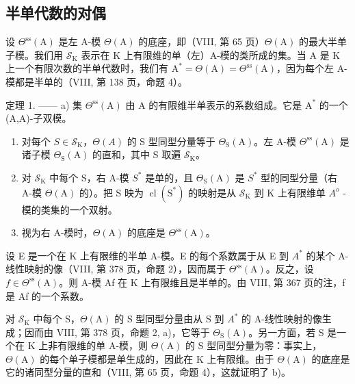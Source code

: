 \subsection{半单代数的对偶}

设 \(\Theta^{\mathrm{ss}}(\mathrm{A})\) 是左 A-模 \(\Theta (\mathrm{A})\) 的底座，即（VIII, 第 65 页）\(\Theta (\mathrm{A})\) 的最大半单子模。我们用 \(\mathcal{S}_{\mathrm{K}}\) 表示在 K 上有限维的单（左）A-模的类所成的集。当 A 是 K 上一个有限次数的半单代数时，我们有 \(\mathrm{A}^{*} = \Theta (\mathrm{A}) = \Theta^{\mathrm{ss}}(\mathrm{A})\)，因为每个左 A-模都是半单的（VIII, 第 138 页，命题 4）。

定理 1. —— a) 集 \(\Theta^{\mathrm{ss}}(\mathrm{A})\) 由 A 的有限维半单表示的系数组成。它是 \(\mathrm{A}^*\) 的一个 (A,A)-子双模。

\begin{enumerate}
\def\labelenumi{\alph{enumi})}
\setcounter{enumi}{1}
\item
  对每个 \(S \in \mathcal{S}_{\mathrm{K}}\)，\(\Theta(A)\) 的 S 型同型分量等于 \(\Theta_{\mathrm{S}}(\mathrm{A})\)。左 A-模 \(\Theta^{\mathrm{ss}}(\mathrm{A})\) 是诸子模 \(\Theta_{\mathrm{S}}(\mathrm{A})\) 的直和，其中 S 取遍 \(\mathcal{S}_{\mathrm{K}}\)。
\item
  对 \(\mathcal{S}_{\mathrm{K}}\) 中每个 S，右 A-模 \(S^{*}\) 是单的，且 \(\Theta_{\mathrm{S}}(\mathrm{A})\) 是 \(S^{*}\) 型的同型分量（右 A-模 \(\Theta(\mathrm{A})\) 的）。把 S 映为 \(\operatorname{cl}(\mathrm{S}^{*})\) 的映射是从 \(\mathcal{S}_{\mathrm{K}}\) 到 K 上有限维单 \(A^{o}\) -模的类集的一个双射。
\item
  视为右 A-模时，\(\Theta (\mathrm{A})\) 的底座是 \(\Theta^{\mathrm{ss}}(\mathrm{A})\)。
\end{enumerate}

设 E 是一个在 K 上有限维的半单 A-模。E 的每个系数属于从 E 到 \(A^{*}\) 的某个 A-线性映射的像（VIII, 第 378 页，命题 2），因而属于 \(\Theta^{\mathrm{ss}}(\mathrm{A})\)。反之，设 \(f \in \Theta^{\mathrm{ss}}(\mathrm{A})\)。则 A-模 Af 在 K 上有限维且是半单的。由 VIII, 第 367 页的注，f 是 Af 的一个系数。

对 \(\mathcal{S}_{\mathrm{K}}\) 中每个 S，\(\Theta(\mathrm{A})\) 的 S 型同型分量由从 S 到 \(A^{*}\) 的 A-线性映射的像生成；因而由 VIII, 第 378 页，命题 2, a)，它等于 \(\Theta_{\mathrm{S}}(\mathrm{A})\)。另一方面，若 S 是一个在 K 上非有限维的单 A-模，则 \(\Theta(\mathrm{A})\) 的 S 型同型分量为零：事实上，\(\Theta(\mathrm{A})\) 的每个单子模都是单生成的，因此在 K 上有限维。由于 \(\Theta(\mathrm{A})\) 的底座是它的诸同型分量的直和（VIII, 第 65 页，命题 4），这就证明了 b)。

